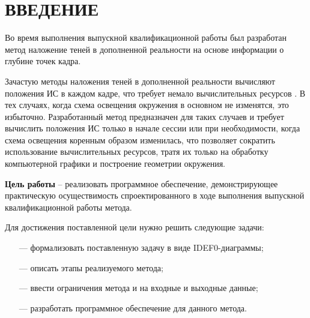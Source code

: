 \chapter*{ВВЕДЕНИЕ}

Во время выполнения выпускной квалификационной работы был разработан метод наложение теней в дополненной реальности на основе информации о глубине точек кадра. 

Зачастую методы наложения теней в дополненной реальности вычисляют положения ИС в каждом кадре, что требует немало вычислительных ресурсов \cite{osti2019real}. В тех случаях, когда схема освещения окружения в основном не изменятся, это избыточно. Разработанный метод предназначен для таких случаев и требует вычислить положения ИС только в начале сессии или при необходимости, когда схема освещения коренным образом изменилась, что позволяет сократить использование вычислительных ресурсов, тратя их только на обработку компьютерной графики и построение геометрии окружения.

\textbf{Цель работы} -- реализовать программное обеспечение, демонстрирующее практическую осуществимость спроектированного в ходе выполнения выпускной квалификационной работы метода.

Для достижения поставленной цели нужно решить следующие задачи:

\begin{itemize}
	\item[---] формализовать поставленную задачу в виде IDEF0-диаграммы;
	\item[---] описать этапы реализуемого метода;
	\item[---] ввести ограничения метода и на входные и выходные данные;
	\item[---] разработать программное обеспечение для данного метода.
\end{itemize}